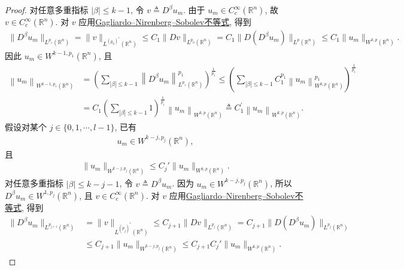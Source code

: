 \documentclass[../../main.tex]{subfiles}
\begin{document}
\begin{proof}
对任意多重指标 $|\beta|\leqslant k-1$, 令 $v\triangleq D^{\beta}u_{m}$. 由于 $u_{m}\in C_{c}^{\infty}(\mathbb{R}^{n})$, 故 $v\in C_{c}^{\infty}(\mathbb{R}^{n})$. 对 $v$ 应用\hyperref[theorem:Gagliardo--Nirenberg--Sobolev不等式]{Gagliardo--Nirenberg--Sobolev不等式}, 得到
\begin{align}\label{eq::jijwIIJEI9-3-first}
\|D^{\beta}u_{m}\|_{L^{p_{1}}(\mathbb{R}^{n})}
=\|v\|_{L^{(p_{0})^{*}}(\mathbb{R}^{n})}\leqslant C_{1}\|Dv\|_{L^{p_{0}}(\mathbb{R}^{n})}=C_{1}\|D(D^{\beta}u_{m})\|_{L^{p}(\mathbb{R}^{n})}\leqslant C_{1}\|u_{m}\|_{W^{k,p}(\mathbb{R}^{n})}.
\end{align}
因此 $u_{m}\in W^{k-1,p_{1}}(\mathbb{R}^{n})$, 且
\begin{align*}
\left\| u_m \right\| _{W^{k-1,p_1}\left( \mathbb{R} ^n \right)}&=\left( \sum_{\left| \beta \right|\leqslant k-1}{\left\| D^{\beta}u_m \right\| _{L^{p_1}\left( \mathbb{R} ^n \right)}^{p_1}} \right) ^{\frac{1}{p_1}}\leqslant \left( \sum_{\left| \beta \right|\leqslant k-1}{C_1^{p_1}\left\| u_m \right\| _{W^{k,p}\left( \mathbb{R} ^n \right)}^{p_1}} \right) ^{\frac{1}{p_1}}
\\&=C_{1}\left( \sum_{\left| \beta \right|\leqslant k-1}{1} \right) ^{\frac{1}{p_1}}\left\| u_m \right\| _{W^{k,p}\left( \mathbb{R} ^n \right)}\triangleq C_{1}^{\prime}\left\| u_m \right\| _{W^{k,p}\left( \mathbb{R} ^n \right)}.
\end{align*}
假设对某个 $j\in\{0,1,\cdots,l-1\}$, 已有
\begin{align*}
u_{m}\in W^{k-j,p_{j}}(\mathbb{R}^{n}),
\end{align*}
且
\begin{align*}
\|u_{m}\|_{W^{k-j,p_{j}}(\mathbb{R}^{n})}\leqslant C_{j}'\|u_{m}\|_{W^{k,p}(\mathbb{R}^{n})}.
\end{align*}
对任意多重指标 $|\beta|\leqslant k-j-1$, 令 $v\triangleq D^{\beta}u_{m}$. 因为 $u_{m}\in W^{k-j,p_{j}}(\mathbb{R}^{n})$, 所以 $D^{\beta}u_{m}\in W^{1,p_{j}}(\mathbb{R}^{n})$, 且 $v\in C_{c}^{\infty}(\mathbb{R}^{n})$. 对 $v$ 应用\hyperref[theorem:Gagliardo--Nirenberg--Sobolev不等式]{Gagliardo--Nirenberg--Sobolev不等式}, 得到
\begin{align*}
\|D^{\beta}u_{m}\|_{L^{p_{j+1}}(\mathbb{R}^{n})}
&=\|v\|_{L^{(p_{j})^{*}}(\mathbb{R}^{n})}\leqslant C_{j+1}\|Dv\|_{L^{p_{j}}(\mathbb{R}^{n})}=C_{j+1}\|D(D^{\beta}u_{m})\|_{L^{p_{j}}(\mathbb{R}^{n})}\\
&\leqslant C_{j+1}\|u_{m}\|_{W^{k-j,p_{j}}(\mathbb{R}^{n})}\leqslant C_{j+1}C_{j}'\|u_{m}\|_{W^{k,p}(\mathbb{R}^{n})}.
\end{align*}

\end{proof}
\end{document}
